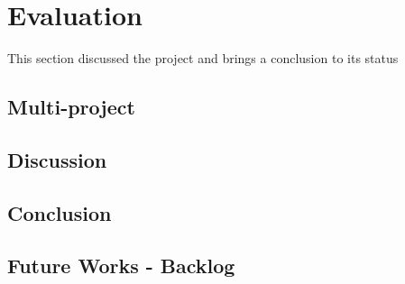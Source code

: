 \chapter{Evaluation}\label{chap:evaluation}
This section discussed the project and brings a conclusion to its status

\section{Multi-project}\label{sec:eval:multiproject}


\section{Discussion}


\section{Conclusion}


\section{Future Works - Backlog}\label{sec:eval:futureworks}
